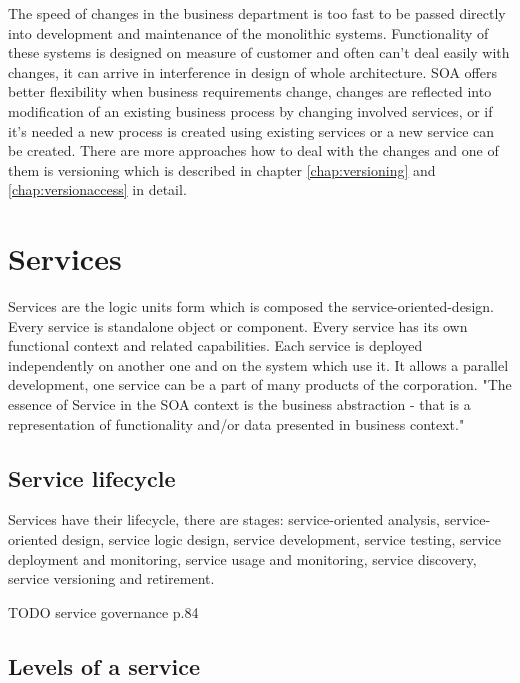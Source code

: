 The speed of changes in the business department is too fast to be passed directly into development and maintenance of the monolithic systems. Functionality of these systems is designed on measure of customer and often can't deal easily with changes, it can arrive in interference in design of whole architecture. SOA offers better flexibility when business requirements change, changes are reflected into modification of an existing business process by changing involved services, or if it's needed a new process is created using existing services or a new service can be created. There are more approaches how to deal with the changes and one of them is versioning which is described in chapter \ref{chap:versioning} and \ref{chap:versionaccess} in detail.

\section{Services}
\label{sec:services}
Services are the logic units form which is composed the \gls{service-oriented-design}. Every service is standalone object or component. Every service has its own functional context and related capabilities. Each service is deployed independently on another one and on the system which use it. It allows a parallel development, one service can be a part of many products of the corporation.
"The essence of Service in the SOA context is the business abstraction - that is a representation of functionality and/or data presented in business context." \cite{agile-architecture}

\subsection{Service lifecycle}
\label{subsec:lifecycle}
Services have their lifecycle, there are stages:
service-oriented analysis, service-oriented design, service logic design, service development, service testing, service deployment and monitoring, service usage and monitoring, service discovery, service versioning and retirement.

TODO service governance p.84


\subsection{Levels of a service} 
\label{subsec:levels-of-service}

